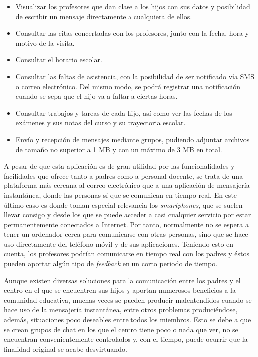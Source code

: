 \begin{itemize}
	\item Visualizar los profesores que dan clase a los hijos con sus datos y posibilidad de escribir un mensaje directamente a cualquiera de ellos.
	\item Consultar las citas concertadas con los profesores, junto con la fecha, hora y motivo de la visita.
	\item Consultar el horario escolar.
	\item Consultar las faltas de asistencia, con la posibilidad de ser notificado vía SMS o correo electrónico. Del mismo modo, se podrá registrar una notificación cuando se sepa que el hijo va a faltar a ciertas horas.
	\item Consultar trabajos y tareas de cada hijo, así como ver las fechas de los exámenes y sus notas del curso y su trayectoria escolar.
	\item Envío y recepción de mensajes mediante grupos, pudiendo adjuntar archivos de tamaño no superior a 1 \acf{MB} y con un máximo de 3 \acs{MB} en total.
\end{itemize}

A pesar de que esta aplicación es de gran utilidad por las funcionalidades y facilidades que ofrece tanto a padres como a personal docente, se trata de una plataforma más cercana al correo electrónico que a una aplicación de mensajería instantánea, donde las personas sí que se comunican en tiempo real. En este último caso es donde toman especial relevancia los \textit{smartphones}, que se suelen llevar consigo y desde los que se puede acceder a casi cualquier servicio por estar permanentemente conectados a Internet. Por tanto, normalmente no se espera a tener un ordenador cerca para comunicarse con otras personas, sino que se hace uso directamente del teléfono móvil y de sus aplicaciones. Teniendo esto en cuenta, los profesores podrían comunicarse en tiempo real con los padres y éstos pueden aportar algún tipo de \textit{feedback} en un corto periodo de tiempo.

Aunque existen diversas soluciones para la comunicación entre los padres y el centro en el que se encuentren sus hijos y aportan numerosos beneficios a la comunidad educativa, muchas veces se pueden producir malentendidos cuando se hace uso de la mensajería instantánea, entre otros problemas produciéndose, además, situaciones poco deseables entre todos los miembros. Esto se debe a que se crean grupos de chat en los que el centro tiene poco o nada que ver, no se encuentran convenientemente controlados y, con el tiempo, puede ocurrir que la finalidad original se acabe desvirtuando.

